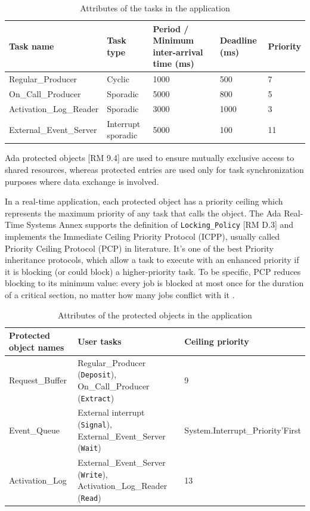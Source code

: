 \documentclass{article}
\begin{document}
\begin{table}[!htbp]
   \centering
   \begin{tabular}{lllll}
     \toprule
     Task name & Task type & Period / Minimum inter-arrival time (ms) & Deadline (ms) & Priority  \\
     \midrule
     Regular\_Producer & Cyclic & 1000 & 500 & 7 \\
     On\_Call\_Producer & Sporadic & 5000 & 800 & 5 \\
     Activation\_Log\_Reader & Sporadic & 3000 & 1000 & 3 \\
     External\_Event\_Server & Interrupt sporadic & 5000 & 100 & 11 \\
     \bottomrule
   \end{tabular}
   \caption{Attributes of the tasks in the application \cite{ycs}}
   \label{tab:holistic-fps}
\end{table}

Ada protected objects [RM 9.4] are used to ensure mutually exclusive access to shared resources, whereas protected entries are used only for task synchronization purposes where data exchange is involved.

In a real-time application, each protected object has a priority ceiling which represents the maximum priority of any task that calls the object. The Ada Real-Time Systems Annex supports the definition of  \texttt{Locking\_Policy} [RM D.3] and implements the Immediate Ceiling Priority Protocol (ICPP), usually called Priority Ceiling Protocol (PCP) in literature. It's one of the best Priority inheritance protocols, which allow a task to execute with an enhanced priority if it is blocking (or could block) a higher-priority task. To be specific, PCP reduces blocking to its minimum value: every job is blocked at most once for the duration of a critical section, no matter how many jobs conflict with it \cite{pcp-blocking}.

\begin{table}[!htbp]
   \centering
   \begin{tabular}{lll}
     \toprule
     Protected object names & User tasks & Ceiling priority  \\
     \midrule
     Request\_Buffer & Regular\_Producer (\texttt{Deposit}), On\_Call\_Producer (\texttt{Extract}) & 9 \\
     Event\_Queue & External interrupt (\texttt{Signal}), External\_Event\_Server (\texttt{Wait}) & System.Interrupt\_Priority'First \\
     Activation\_Log & External\_Event\_Server (\texttt{Write}), Activation\_Log\_Reader (\texttt{Read}) & 13 \\
     \bottomrule
   \end{tabular}
   \caption{Attributes of the protected objects in the application \cite{ycs}}
   \label{tab:holistic-fps}
\end{table}
\end{document}
